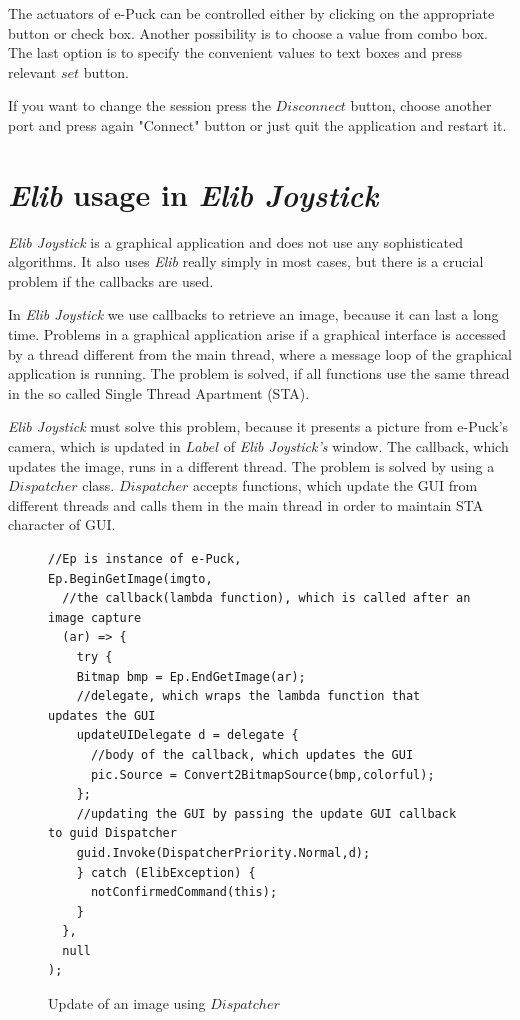   The actuators of e-Puck can be controlled either by clicking 
  on the appropriate button or check box. 
  Another	possibility is to choose a value from combo box.
  The last option is to specify the  convenient values 
  to text boxes and press relevant $set$ button.

  If you want to change the session press the $Disconnect$ button, choose another port and 
  press again "Connect" button or just quit the application and restart it.

  \section{{\it Elib} usage in {\it Elib Joystick}}\label{sec:joystick_trick}
  {\it Elib Joystick} is a graphical application and does not use any sophisticated algorithms. 
  It also uses {\it Elib} really simply in most cases, but there is a crucial problem if the callbacks are used.

  In {\it Elib Joystick} we use callbacks to retrieve an image, because it can last a long time.
  Problems in a graphical application arise if a graphical interface is accessed by a thread different from
  the main thread, where a message loop of the graphical application is running. The problem is solved,
  if all functions use the same thread in the so called Single Thread Apartment (STA).

  {\it Elib Joystick} must solve this problem, because it presents a picture from e-Puck's camera, 
  which is updated in $Label$ of {\it Elib Joystick's} window. 
  The callback, which updates the image, runs in a different thread.
  The problem is solved by using a $Dispatcher$ class. $Dispatcher$ accepts functions, 
  which update the GUI from different threads and calls them in the main thread 
  in order to maintain STA character of GUI. 

\begin{figure}[!hbp]
\begin{lstlisting}
//Ep is instance of e-Puck,
Ep.BeginGetImage(imgto,
  //the callback(lambda function), which is called after an image capture
  (ar) => {
    try {
    Bitmap bmp = Ep.EndGetImage(ar);
    //delegate, which wraps the lambda function that updates the GUI
    updateUIDelegate d = delegate {
      //body of the callback, which updates the GUI
      pic.Source = Convert2BitmapSource(bmp,colorful);
    };
    //updating the GUI by passing the update GUI callback to guid Dispatcher
    guid.Invoke(DispatcherPriority.Normal,d);
    } catch (ElibException) {
      notConfirmedCommand(this);
    }
  }, 
  null
);
\end{lstlisting}
\caption{Update of an image using $Dispatcher$}
\label{updispatcher}
\end{figure}


